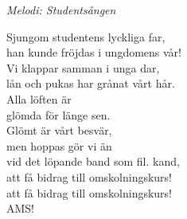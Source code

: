 {\footnotesize\textit{Melodi: Studentsången}}\par
\vspace{10pt}
Sjungom studentens lyckliga far,\\
han kunde fröjdas i ungdomens vår!\\
Vi klappar samman i unga dar,\\
lån och pukas har grånat vårt hår.\\
Alla löften är\\
glömda för länge sen.\\
Glömt är vårt besvär,\\
men hoppas gör vi än\\
vid det löpande band som fil. kand,\\
att få bidrag till omskolningskurs!\\
att få bidrag till omskolningskurs!\\
AMS!

